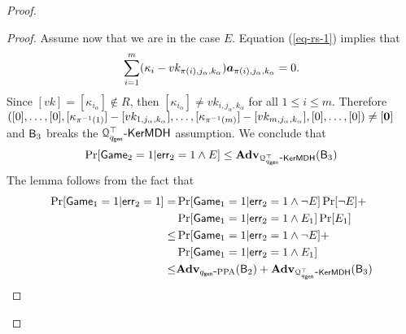 \begin{proof}
\begin{proof}
Assume now that we are in the case $E$. Equation (\ref{eq-rs-1}) implies that
\begin{align*}
\sum_{i=1}^{m}(\kappa_i-vk_{\pi(i),j_\alpha,k_\alpha}){\boldsymbol{a}}_{\pi(i),j_\alpha,k_\alpha}=0.
\end{align*}
Since $[vk]=[\kappa_{i_\alpha}]\notin R$, then $[\kappa_{i_\alpha}]\neq vk_{i,j_\alpha,k_\alpha}$ for all $1\leq i\leq m$. Therefore $([0],\ldots,[0],\allowbreak [\kappa_{\pi^{-1}(1)}]-[vk_{1,j_\alpha,k_\alpha}],\ldots,[\kappa_{\pi^{-1}(m)}]-[vk_{m,j_\alpha,k_\alpha}],[0],\ldots,[0])\neq [{\boldsymbol{0}}]$ and $\mathsf{B}_3$ breaks the $\mathcal{Q}_{q_\mathsf{gen}}^\top\mbox{-}\allowbreak \mathsf{KerMDH}$ assumption. We conclude that
$$\Pr[\mathsf{Game}_2=1|\mathsf{err}_2=1\wedge E]\leq\mathbf{Adv}_{\mathcal{Q}^\top_{q_\mathsf{gen}}\mbox{-}\mathsf{KerMDH}}(\mathsf{B}_3)$$
The lemma follows from the fact that
\begin{align*}
\Pr[\mathsf{Game}_1=1|\mathsf{err}_2=1]=&\Pr[\mathsf{Game}_1=1|\mathsf{err}_2=1\wedge\neg E]\Pr[\neg E]+\\
&\Pr[\mathsf{Game}_1=1|\mathsf{err}_2=1\wedge{E}_1]\Pr[{E}_1]\\
\leq & \Pr[\mathsf{Game}_1=1|\mathsf{err}_2=1\wedge\neg E]+\\
&\Pr[\mathsf{Game}_1=1|\mathsf{err}_2=1\wedge{E}_1]\\
\leq & \mathbf{Adv}_{{q_\mathsf{gen}}\mbox{-}\mathrm{PPA}}(\mathsf{B}_2)+\mathbf{Adv}_{\mathcal{Q}^\top_{q_\mathsf{gen}}\mbox{-}\mathsf{KerMDH}}(\mathsf{B}_3)
\end{align*}
\end{proof}


\end{proof}

